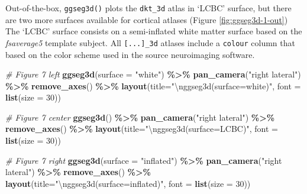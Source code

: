\documentclass[fleqn,10pt]{wlpeerj} %
\newenvironment{Shaded}{\begin{snugshade}}{\end{snugshade}}
\newcommand{\CharTok}[1]{\textcolor[rgb]{0.31,0.60,0.02}{#1}}
\newcommand{\CommentTok}[1]{\textcolor[rgb]{0.56,0.35,0.01}{\textit{#1}}}
\newcommand{\DataTypeTok}[1]{\textcolor[rgb]{0.13,0.29,0.53}{#1}}
\newcommand{\DecValTok}[1]{\textcolor[rgb]{0.00,0.00,0.81}{#1}}
\newcommand{\KeywordTok}[1]{\textcolor[rgb]{0.13,0.29,0.53}{\textbf{#1}}}
\newcommand{\NormalTok}[1]{#1}
\newcommand{\OperatorTok}[1]{\textcolor[rgb]{0.81,0.36,0.00}{\textbf{#1}}}
\newcommand{\StringTok}[1]{\textcolor[rgb]{0.31,0.60,0.02}{#1}}
\begin{document}
Out-of-the-box, \texttt{ggseg3d()} plots the \texttt{dkt\_3d} atlas in `LCBC' surface, but there are two more surfaces available for cortical atlases (Figure \ref{fig:ggseg3d-1-out})
The `LCBC' surface consists on a semi-inflated white matter surface based on the \emph{fsaverage5} template subject.
All \texttt{{[}...{]}\_3d} atlases include a \texttt{colour} column that based on the color scheme used in the source neuroimaging software.



\begin{Shaded}
\begin{Highlighting}[]
\CommentTok{\# Figure 7 left}
\KeywordTok{ggseg3d}\NormalTok{(}\DataTypeTok{surface =} \StringTok{"white"}\NormalTok{)  }\OperatorTok{\%>\%}
\StringTok{  }\KeywordTok{pan\_camera}\NormalTok{(}\StringTok{"right lateral"}\NormalTok{) }\OperatorTok{\%>\%}
\StringTok{  }\KeywordTok{remove\_axes}\NormalTok{() }\OperatorTok{\%>\%}
\StringTok{  }\KeywordTok{layout}\NormalTok{(}\DataTypeTok{title=}\StringTok{"}\CharTok{\textbackslash{}n}\StringTok{ggseg3d(surface=\textquotesingle{}white\textquotesingle{})"}\NormalTok{,}
         \DataTypeTok{font =}  \KeywordTok{list}\NormalTok{(}\DataTypeTok{size =} \DecValTok{30}\NormalTok{))}

\CommentTok{\# Figure 7 center}
\KeywordTok{ggseg3d}\NormalTok{()  }\OperatorTok{\%>\%}
\StringTok{  }\KeywordTok{pan\_camera}\NormalTok{(}\StringTok{"right lateral"}\NormalTok{) }\OperatorTok{\%>\%}
\StringTok{  }\KeywordTok{remove\_axes}\NormalTok{() }\OperatorTok{\%>\%}
\StringTok{  }\KeywordTok{layout}\NormalTok{(}\DataTypeTok{title=}\StringTok{"}\CharTok{\textbackslash{}n}\StringTok{ggseg3d(surface=\textquotesingle{}LCBC\textquotesingle{})"}\NormalTok{,}
         \DataTypeTok{font =}  \KeywordTok{list}\NormalTok{(}\DataTypeTok{size =} \DecValTok{30}\NormalTok{))}

\CommentTok{\# Figure 7 right}
\KeywordTok{ggseg3d}\NormalTok{(}\DataTypeTok{surface =} \StringTok{"inflated"}\NormalTok{) }\OperatorTok{\%>\%}
\StringTok{  }\KeywordTok{pan\_camera}\NormalTok{(}\StringTok{"right lateral"}\NormalTok{) }\OperatorTok{\%>\%}
\StringTok{  }\KeywordTok{remove\_axes}\NormalTok{() }\OperatorTok{\%>\%}
\StringTok{  }\KeywordTok{layout}\NormalTok{(}\DataTypeTok{title=}\StringTok{"}\CharTok{\textbackslash{}n}\StringTok{ggseg3d(surface=\textquotesingle{}inflated\textquotesingle{})"}\NormalTok{,}
         \DataTypeTok{font =}  \KeywordTok{list}\NormalTok{(}\DataTypeTok{size =} \DecValTok{30}\NormalTok{))}
\end{Highlighting}
\end{Shaded}
\end{document}
